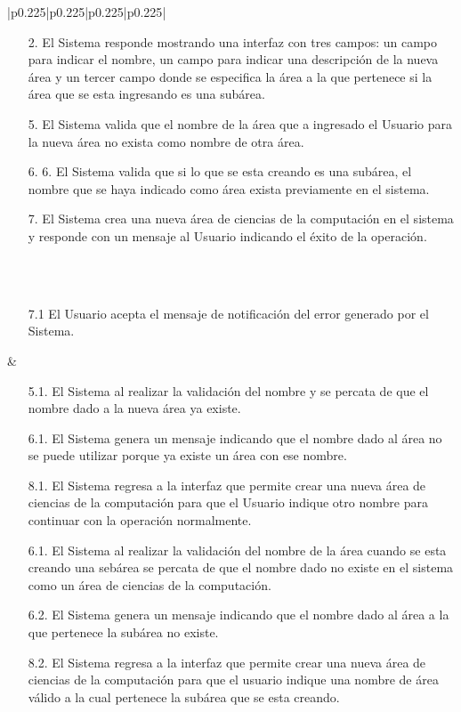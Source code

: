 \begin{center}
\begin{longtable}{|p{}|p{}|p{}|p{}|}
{
\begin{itemize}
\item[2.] El Sistema responde mostrando una interfaz con tres campos: un campo para indicar el nombre, un campo para indicar una descripción de la nueva área y un tercer campo donde se especifica la área a la que pertenece si la área que se esta ingresando es una subárea.
\item[5.]El Sistema valida que el nombre de la área que a ingresado el Usuario para la nueva área no exista como nombre de otra área.
\item[6. ]6. El Sistema valida que si lo que se esta creando es una subárea, el nombre que se haya indicado como área exista previamente en el sistema.
\item[7.] El Sistema crea una nueva área de ciencias de la computación en el sistema y responde con un mensaje al Usuario indicando el éxito de la operación. 
\end{itemize}
} \\
\hline
{}\\
\hline
{}
{
\begin{itemize}
\item[7.1] El Usuario acepta el mensaje de notificación del error generado por el Sistema.
\end{itemize}
} &
{
\begin{itemize}
\item[5.1.] El Sistema al realizar la validación del nombre y se percata de que el nombre dado a la nueva área ya existe.
\item[6.1.] El Sistema genera un mensaje indicando que el nombre dado al área no se puede utilizar porque ya existe un área con ese nombre.
\item[8.1.] El Sistema regresa a la interfaz que permite crear una nueva área de ciencias de la computación para que el Usuario indique otro nombre para continuar con la operación normalmente.
\item[6.1.] El Sistema al realizar la validación del nombre de la área cuando se esta creando una sebárea se percata de que el nombre dado no existe en el sistema como un área de ciencias de la computación.
\item[6.2.  ]El Sistema genera un mensaje indicando que el nombre dado al área a la que pertenece la subárea no existe.
\item[8.2.] El Sistema regresa a la interfaz que permite crear una nueva área de ciencias de la computación para que el usuario indique una nombre de área válido a la cual pertenece la subárea que se esta creando.

\end{itemize}}
\end{longtable}
\end{center}
